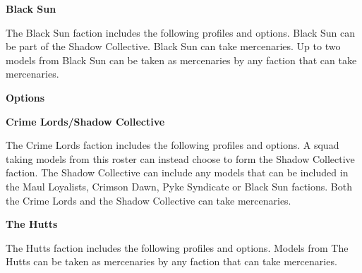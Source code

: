 \documentclass{article}
\begin{document}
\newpage

{\Large \textbf{Black Sun}}
\vspace{0.3cm}

\begin{minipage}{19cm}
    The Black Sun faction includes the following profiles and options.
    Black Sun can be part of the Shadow Collective.
    Black Sun can take mercenaries.
    Up to two models from Black Sun can be taken as mercenaries
    by any faction that can take mercenaries.
\end{minipage}

\vspace{0.3cm}
{\scriptsize
\setlength\extrarowheight{1.5pt}

}
\vspace{0.6cm}

{\large \textbf{Options}}
\vspace{0.3cm}
\begin{multicols}{2}
    {\scriptsize

    \setlength\extrarowheight{1.5pt}
    

    }
\end{multicols}

\vspace{0.6cm}

{\Large \textbf{Crime Lords/Shadow Collective}}
\vspace{0.3cm}

\begin{minipage}{19cm}
    The Crime Lords faction includes the following profiles and options.
    A squad taking models from this roster can instead choose to form the
    Shadow Collective faction. 
    The Shadow Collective can include any models that can be included 
    in the Maul Loyalists, Crimson Dawn, Pyke Syndicate or Black Sun factions.
    Both the Crime Lords and the Shadow Collective can take mercenaries.

\end{minipage}

\vspace{0.3cm}
{\scriptsize
\setlength\extrarowheight{1.5pt}

}

\vspace{0.6cm}

{\Large \textbf{The Hutts}}
\vspace{0.3cm}

\begin{minipage}{19cm}
    The Hutts faction includes the following profiles and options.
    Models from The Hutts can be taken as mercenaries
    by any faction that can take mercenaries.
\end{minipage}

\vspace{0.3cm}
{\scriptsize
\setlength\extrarowheight{1.5pt}

}
\end{document}
